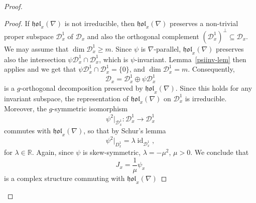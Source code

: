 \documentclass{amsart}
\theoremstyle{plain}
\theoremstyle{definition}
\newcommand{\id}{\operatorname{id}}
\newcommand{\hol}{\mathfrak{hol}}
\newcommand{\Real}{\mathbb{R}}
\newcommand{\1}{\mathbf{1}}
\newcommand{\D}{{\mathcal D}}
\newcommand{\+}{\oplus}
\begin{document}
\begin{proof}
\begin{proof}
If $\hol_x(\nabla)$ is not irreducible, then  $\hol_x(\nabla)$ preserves  a non-trivial proper subspace $\D^1_x$  of $ \D_x$ and  also the orthogonal complement $(\D^1_x)^\bot\subseteq \D_x$. We may assume that $\dim \D^1_x\geq m$. Since $\psi$  is $\nabla$-parallel,  
$\hol_x(\nabla)$ preserves also the intersection $\psi \D^1_x\cap \D^1_x$, which is $\psi$-invariant. Lemma~\ref{psiinv-lem} then applies and we get that $\psi \D^1_x\cap \D^1_x=\{0\}$, and $\dim \D^1_x= m$. Consequently,  $$\D_x=\D^1_x\oplus \psi \D^1_x$$  is a $g$-orthogonal decomposition preserved by $\hol_x(\nabla)$. 
Since this holds for any invariant subspace, the representation of $\hol_x(\nabla)$ on $\D^1_x$ is irreducible.
Moreover, the $g$-symmetric isomorphism $$\psi^2|_{\D^1_x}:\D^1_x\to \D^1_x$$ commutes with $\hol_x(\nabla)$, so that by Schur's lemma $$\psi^2|_{D^1_x}=\lambda\id_{\D^1_x},$$
for $\lambda\in \Real$.
Again, since $\psi$ is skew-symmetric, $\lambda=-\mu^2$, $\mu>0$.
We conclude that $$J_x=\frac{1}{\mu}\psi_x$$ is a  complex structure commuting with  $\hol_x(\nabla)$
\end{proof}


\end{proof}
\end{document}
